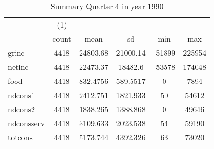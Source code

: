\begin{table}[htbp]\centering
\def\sym#1{\ifmmode^{#1}\else\(^{#1}\)\fi}
\caption{Summary Quarter 4 in year 1990 \label{sum\_Q4\_y1990}}
\begin{tabular}{l*{1}{ccccc}}
\hline\hline
            &\multicolumn{1}{c}{(1)}&            &            &            &            \\
            &       count&        mean&          sd&         min&         max\\
\hline
grinc       &        4418&    24803.68&    21000.14&      -51899&      225954\\
netinc      &        4418&    22473.37&     18482.6&      -53578&      174048\\
food        &        4418&    832.4756&    589.5517&           0&        7894\\
ndcons1     &        4418&    2412.751&    1821.933&          50&       54612\\
ndcons2     &        4418&    1838.265&    1388.868&           0&       49646\\
ndconsserv  &        4418&    3109.633&    2023.538&          54&       59190\\
totcons     &        4418&    5173.744&    4392.326&          63&       73020\\
\hline\hline
\end{tabular}
\end{table}
